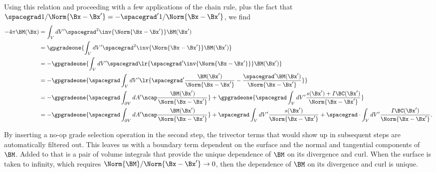 Using this relation and proceeding with a few applications of the chain rule, plus the fact that \( \spacegrad 1/\Norm{\Bx - \Bx'} = -\spacegrad' 1/\Norm{\Bx - \Bx'} \), we find
%
%
%
\begin{equation}\label{eqn:helmholtzDerviationMultivector:720}
\begin{aligned}
-4 \pi \BM(\Bx)
&= \int_V dV' \spacegrad^2 \inv{\Norm{\Bx - \Bx'}} \BM(\Bx') \\
&= \gpgradeone{\int_V dV' \spacegrad^2 \inv{\Norm{\Bx - \Bx'}} \BM(\Bx')} \\
&= -\gpgradeone{\int_V dV' \spacegrad \lr{ \spacegrad' \inv{\Norm{\Bx - \Bx'}}} \BM(\Bx')} \\
&= -\gpgradeone{\spacegrad \int_V dV' \lr{
  \spacegrad' \frac{\BM(\Bx')}{\Norm{\Bx - \Bx'}}
  -\frac{\spacegrad' \BM(\Bx')}{\Norm{\Bx - \Bx'}}
  } } \\
&= -\gpgradeone{\spacegrad \int_{\partial V} dA'
 \ncap \frac{\BM(\Bx')}{\Norm{\Bx - \Bx'}}
 } +\gpgradeone{\spacegrad \int_V dV'
 \frac{s(\Bx') + I\BC(\Bx')}{\Norm{\Bx - \Bx'}}
 } \\
&= -\gpgradeone{\spacegrad \int_{\partial V} dA'
\ncap \frac{\BM(\Bx')}{\Norm{\Bx - \Bx'}}
 }
+\spacegrad \int_V dV'
\frac{s(\Bx')}{\Norm{\Bx - \Bx'}}
+\spacegrad \cdot \int_V dV'
\frac{I\BC(\Bx')}{\Norm{\Bx - \Bx'}}.
\end{aligned}
\end{equation}

By inserting a no-op grade selection operation in the second step, the trivector terms that would show up in subsequent steps are automatically filtered out.
This leaves us with a boundary term dependent on the surface and the normal and tangential components of \( \BM \).  Added to that is a pair of volume integrals that provide the unique dependence of \( \BM \) on its divergence and curl.
When the surface is taken to infinity, which requires \( \Norm{\BM}/\Norm{\Bx - \Bx'} \rightarrow 0 \), then the dependence of \( \BM \) on its divergence and curl is unique.

